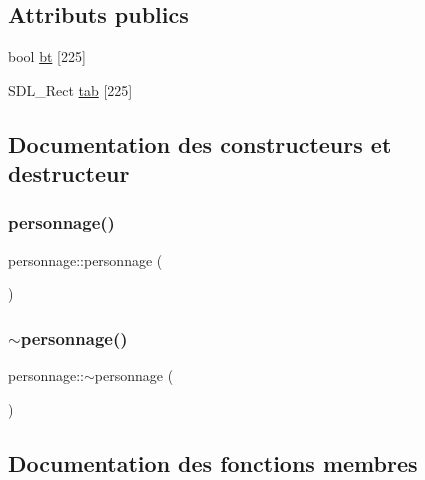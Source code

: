 \subsection*{Attributs publics}
\begin{DoxyCompactItemize}
\item 
bool \hyperlink{classpersonnage_a3ee9e6a0b7a3fe87eae44f7e5be4dbbf}{bt} \mbox{[}225\mbox{]}
\item 
S\+D\+L\+\_\+\+Rect \hyperlink{classpersonnage_a1171004d3549c3fae8e4c64c959a74bf}{tab} \mbox{[}225\mbox{]}
\end{DoxyCompactItemize}


\subsection{Documentation des constructeurs et destructeur}
\mbox{\label{classpersonnage_acd9ca516f8c5c110687e5167dab8db59}} 
\subsubsection{\texorpdfstring{personnage()}{personnage()}}
{\footnotesize\ttfamily personnage\+::personnage (\begin{DoxyParamCaption}{ }\end{DoxyParamCaption})}

\mbox{\label{classpersonnage_a3258008aea95a40b54591ee6bc7129be}} 
\subsubsection{\texorpdfstring{$\sim$personnage()}{~personnage()}}
{\footnotesize\ttfamily personnage\+::$\sim$personnage (\begin{DoxyParamCaption}{ }\end{DoxyParamCaption})}



\subsection{Documentation des fonctions membres}
\mbox{\label{classpersonnage_a13eb75d232d184e031ac3407e1313f3d}} 
